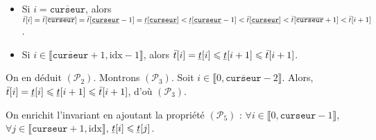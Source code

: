 \documentclass[a4paper]{article}
\begin{document}
\begin{prv}
\begin{itemize}
				\begin{itemize}
					\item Si $i = \overline{\texttt{curseur}}$, alors $\bar{t}[i] = \bar{t}[\overline{\texttt{curseur}}] = \bar{t}[\underline{\texttt{curseur}} - 1] = \ubar{t}[\underline{\texttt{curseur}}] < \ubar{t}[\underline{\texttt{curseur}} - 1] < \bar{t}[\underline{\texttt{curseur}}] < \bar{t}[\overline{\texttt{curseur}} + 1] < \bar{t}[i+1]$.
					\item Si $i \in \llbracket \overline{\texttt{curseur}} + 1, \mathrm{idx} - 1 \rrbracket$, alors $\bar{t}[i] = \ubar{t}[i] \le \ubar{t}[i + 1] \le \bar{t}[i+1]$.
				\end{itemize}
				On en déduit $(\mathcal{P}_2)$.
				Montrons $(\mathcal{P}_3)$.
				Soit $i \in \llbracket 0, \overline{\texttt{curseur}} - 2 \rrbracket$. Alors, $\bar{t}[i] = \ubar{t}[i] \le \ubar{t}[i + 1] \le \bar{t}[i+1]$, d'où $(\mathcal{P}_3)$.
		\end{itemize}
		On enrichit l'invariant en ajoutant la propriété $(\mathcal{P}_5)$ : $\forall i \in \llbracket 0, \texttt{curseur} - 1 \rrbracket$, $\forall j \in \llbracket \texttt{curseur} + 1, \mathrm{idx} \rrbracket$, $\ubar{t}[i] \le \ubar{t}[j]$.
	\end{prv}
\end{document}
